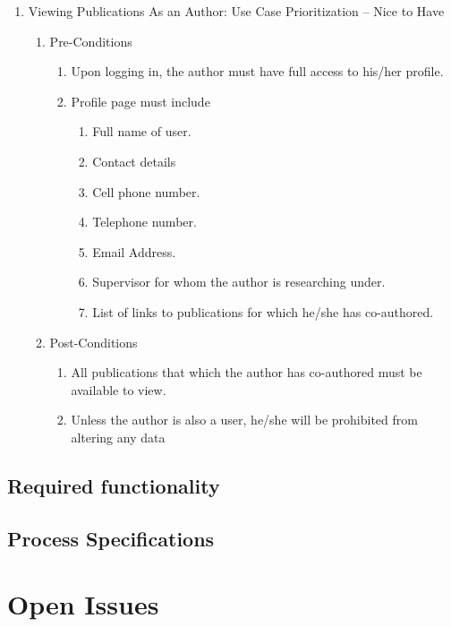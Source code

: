 \documentclass[10pt,a4paper]{exam}
\begin{document}
\begin{enumerate}
\item  Viewing Publications As an Author: Use Case Prioritization -- Nice to Have

\begin{enumerate}
\item  Pre-Conditions

\begin{enumerate}
\item  Upon logging in, the author must have full access to his/her profile.

\item  Profile page must include

\begin{enumerate}
\item  Full name of user.

\item  Contact details

\item  Cell phone number.

\item  Telephone number.

\item  Email Address.

\item  Supervisor for whom the author is researching under.

\item  List of links to publications for which he/she has co-authored.
\end{enumerate}
\end{enumerate}

\item  Post-Conditions

\begin{enumerate}
\item  All publications that which the author has co-authored must be available to view.

\item  Unless the author is also a user, he/she will be prohibited from altering any data  
\end{enumerate}
\end{enumerate}
\end{enumerate}

\subsection{Required functionality}
\lipsum[8]
\subsection{Process Specifications}
\lipsum[9]

\section{Open Issues}
\lipsum[10]
%
%
\end{document}
